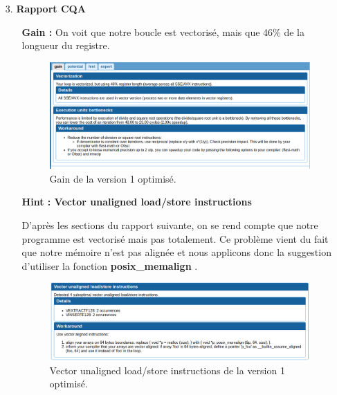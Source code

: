 \documentclass[a4paper, 12pt, twoside]{article}
\begin{document}
\begin{enumerate}
\begin{figure}[h]
    \end{figure}
    
    \item[3.]\textbf{Rapport CQA}
     \begin{enumerate}
         \item[\textbullet] \textbf{Gain : }
         On voit que notre boucle est vectorisé, mais que 46\% de la longueur du registre.
         \begin{figure}[h]
    \centering
    \includegraphics[width=\textwidth]{Figures/cap13.png}
    \caption{Gain de la version 1 optimisé.}
    
    \end{figure}
    \newpage
         \item[\textbullet] \textbf{Hint : Vector unaligned load/store instructions}
         
         D'après les sections du rapport suivante, on se rend compte que notre programme est vectorisé mais pas totalement. Ce problème vient du fait que notre mémoire n'est pas alignée et nous applicons donc la suggestion d'utiliser la fonction \textbf{posix\_memalign} . 
         \begin{figure}[h]
    \centering
    \includegraphics[width=\textwidth]{Figures/cap15.png}
    \caption{Vector unaligned load/store instructions de la version 1 optimisé.}
    
    \end{figure}
        
     \end{enumerate}
    
\end{enumerate}
\end{document}
